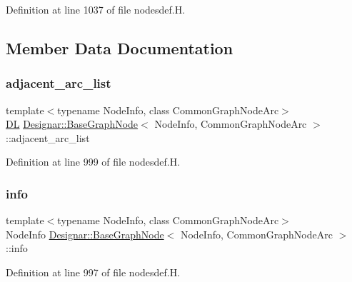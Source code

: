 Definition at line 1037 of file nodesdef.\+H.



\subsection{Member Data Documentation}
\mbox{\label{class_designar_1_1_base_graph_node_a160dab27497d195ecdf93272a40a2cb5}} 
\subsubsection{\texorpdfstring{adjacent\+\_\+arc\+\_\+list}{adjacent\_arc\_list}}
{\footnotesize\ttfamily template$<$typename Node\+Info, class Common\+Graph\+Node\+Arc$>$ \\
\hyperlink{class_designar_1_1_d_l}{DL} \hyperlink{class_designar_1_1_base_graph_node}{Designar\+::\+Base\+Graph\+Node}$<$ Node\+Info, Common\+Graph\+Node\+Arc $>$\+::adjacent\+\_\+arc\+\_\+list\hspace{0.3cm}{\ttfamily [protected]}}



Definition at line 999 of file nodesdef.\+H.

\mbox{\label{class_designar_1_1_base_graph_node_a78196723c561b3554cf8760ab2d902a8}} 
\subsubsection{\texorpdfstring{info}{info}}
{\footnotesize\ttfamily template$<$typename Node\+Info, class Common\+Graph\+Node\+Arc$>$ \\
Node\+Info \hyperlink{class_designar_1_1_base_graph_node}{Designar\+::\+Base\+Graph\+Node}$<$ Node\+Info, Common\+Graph\+Node\+Arc $>$\+::info\hspace{0.3cm}{\ttfamily [protected]}}



Definition at line 997 of file nodesdef.\+H.

